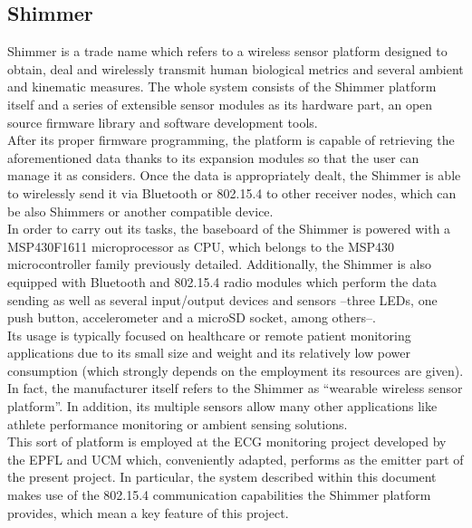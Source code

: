 		\subsection{Shimmer\texttrademark}
			Shimmer \cite{Shimmer} is a trade name which refers to a wireless sensor platform designed to
			obtain, deal and wirelessly transmit human biological metrics and several ambient and
			kinematic measures. The whole system consists of the Shimmer platform itself and a series of
			extensible sensor modules as its hardware part, an open source firmware library and software
			development tools.\\

			After its proper firmware programming, the platform is capable of retrieving the aforementioned data
			thanks to its expansion modules \cite{ShimmerExp} so that the user can manage it as considers. Once
			the data is appropriately dealt, the Shimmer is able to wirelessly send it via Bluetooth or 802.15.4
			to other receiver nodes, which can be also Shimmers or another compatible device.\\

			In order to carry out its tasks, the baseboard of the Shimmer is powered with a MSP430F1611
			microprocessor as CPU, which belongs to the MSP430 microcontroller family previously detailed.
			Additionally, the Shimmer is also equipped with Bluetooth and 802.15.4 radio modules which perform
			the data sending as well as several input/output devices and sensors --three LEDs, one push button,
			accelerometer and a microSD socket, among others--.\\

			Its usage is typically focused on healthcare or remote patient monitoring applications due to its
			small size and weight and its relatively low power consumption (which strongly depends on the
			employment its resources are given). In fact, the manufacturer itself refers to the Shimmer as 
			``wearable wireless sensor platform''. In addition, its multiple sensors allow many other
			applications like athlete performance monitoring or ambient sensing solutions.\\

			This sort of platform is employed at the ECG monitoring project \cite{ESL} developed by the EPFL and
			UCM which, conveniently adapted, performs as the emitter part of the present project. In particular,
			the system described within this document makes use of the 802.15.4 communication capabilities the
			Shimmer platform provides, which mean a key feature of this project.\\

